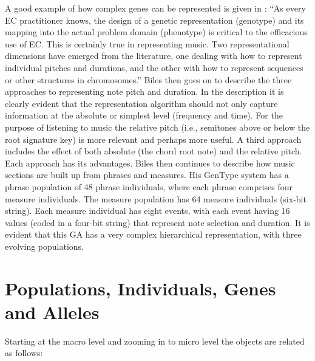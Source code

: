 A good example of how complex genes can be represented is given in \cite{Biles2007}: 
``As every EC practitioner knows, the design of a genetic representation (genotype)
and its mapping into the actual problem domain (phenotype) is critical to the efficacious
use of EC. This is certainly true in representing music. Two representational
dimensions have emerged from the literature, one dealing with how to represent
individual pitches and durations, and the other with how to represent sequences or
other structures in chromosomes.'' Biles then goes on to describe the three approaches to representing note pitch and duration. In the description it is clearly evident that the representation algorithm should not only capture information at the absolute or simplest level (frequency and time). For the purpose of listening to music the relative pitch (i.e., semitones above or below the root signature key) is more relevant and perhaps more useful. A third approach includes the effect of both absolute (the chord root note) and the relative pitch. Each approach has its advantages. Biles then continues to describe \cite{Bilesb2007} how music sections are built up from phrases and measures.  His GenType system has a phrase population of 48 phrase individuals, where each phrase comprises four measure individuals.  The measure population has 64 measure individuals (six-bit string). Each measure individual has eight events, with each event having 16 values (coded in a four-bit string) that represent note selection and duration.
It is evident that this GA has a very complex hierarchical representation, with three evolving populations.


\section{Populations, Individuals, Genes and Alleles}

Starting at the macro level and zooming in to micro level the objects are related as follows:

